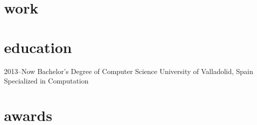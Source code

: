 \documentclass[]{friggeri-cv} %
\begin{document}

\section{work}

\begin{entrylist}





\end{entrylist}




\section{education}

\begin{entrylist}


\entry
{2013--Now}
{Bachelor's Degree {\normalfont of Computer Science}}
{University of Valladolid, Spain}
{Specialized in Computation}



\end{entrylist}



\section{awards}
\end{document}

